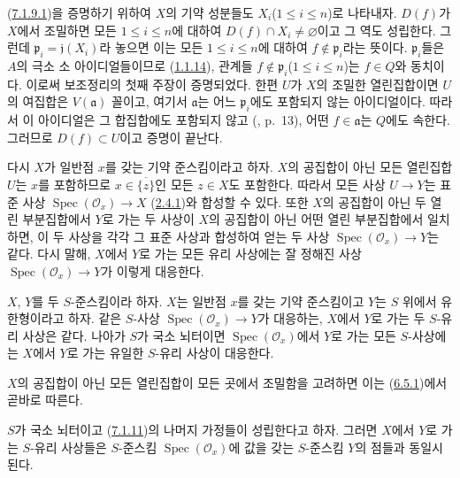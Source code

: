 (\hyperref[I.7.1.9.1-ko]{7.1.9.1})을 증명하기 위하여 $X$의 기약
성분들도 $X_i$($1\leq i\leq n$)로 나타내자. $D(f)$가 $X$에서
조밀하면 모든 $1\leq i\leq n$에 대하여
$D(f)\cap X_i\neq\varnothing$이고 그 역도 성립한다. 그런데
$\mathfrak{p}_i=\mathfrak{j}(X_i)$라 놓으면 이는 모든
$1\leq i\leq n$에 대하여 $f\notin\mathfrak{p}_i$라는 뜻이다.
$\mathfrak{p}_i$들은 $A$의 극소 소 아이디얼들이므로
(\hyperref[I.1.1.14-ko]{1.1.14}), 관계들
$f\notin\mathfrak{p}_i$($1\leq i\leq n$)는 $f\in Q$와 동치이다.
이로써 보조정리의 첫째 주장이 증명되었다. 한편 $U$가 $X$의 조밀한
열린집합이면 $U$의 여집합은 $V(\mathfrak{a})$ 꼴이고, 여기서
$\mathfrak{a}$는 어느 $\mathfrak{p}_i$에도 포함되지 않는
아이디얼이다. 따라서 이 아이디얼은 그 합집합에도 포함되지 않고
(\cite{I-10}, p.~13), 어떤 $f\in\mathfrak{a}$는 $Q$에도 속한다.
그러므로 $D(f)\subset U$이고 증명이 끝난다.

\begin{env}[7.1.10]
\label{I.7.1.10-ko}
다시 $X$가 일반점 $x$를 갖는 기약 준스킴이라고 하자. $X$의
공집합이 아닌 모든 열린집합 $U$는 $x$를 포함하므로
$x\in\overline{\{z\}}$인 모든 $z\in X$도 포함한다. 따라서 모든
사상 $U\to Y$는 표준 사상 $\operatorname{Spec}(\mathscr{O}_x)\to X$
(\hyperref[I.2.4.1-ko]{2.4.1})와 합성할 수 있다. 또한 $X$의 공집합이
아닌 두 열린 부분집합에서 $Y$로 가는 두 사상이 $X$의 공집합이 아닌
어떤 열린 부분집합에서 일치하면, 이 두 사상을 각각 그 표준 사상과
합성하여 얻는 두 사상
$\operatorname{Spec}(\mathscr{O}_x)\to Y$는 같다. 다시 말해,
$X$에서 $Y$로 가는 모든 유리 사상에는 잘 정해진 사상
$\operatorname{Spec}(\mathscr{O}_x)\to Y$가 이렇게 대응한다.
\end{env}

\begin{proposition}[7.1.11]
\label{I.7.1.11-ko}
$X$, $Y$를 두 $S$-준스킴이라 하자. $X$는 일반점 $x$를 갖는
기약 준스킴이고 $Y$는 $S$ 위에서 유한형이라고 하자. 같은
$S$-사상 $\operatorname{Spec}(\mathscr{O}_x)\to Y$가 대응하는,
$X$에서 $Y$로 가는 두 $S$-유리 사상은 같다. 나아가 $S$가 국소
뇌터이면 $\operatorname{Spec}(\mathscr{O}_x)$에서 $Y$로 가는 모든
$S$-사상에는 $X$에서 $Y$로 가는 유일한 $S$-유리 사상이 대응한다.
\end{proposition}

$X$의 공집합이 아닌 모든 열린집합이 모든 곳에서 조밀함을 고려하면
이는 (\hyperref[I.6.5.1-ko]{6.5.1})에서 곧바로 따른다.

\begin{corollary}[7.1.12]
\label{I.7.1.12-ko}
$S$가 국소 뇌터이고 (\hyperref[I.7.1.11-ko]{7.1.11})의 나머지
가정들이 성립한다고 하자. 그러면 $X$에서 $Y$로 가는 $S$-유리
사상들은 $S$-준스킴 $\operatorname{Spec}(\mathscr{O}_x)$에 값을 갖는
$S$-준스킴 $Y$의 점들과 동일시된다.
\end{corollary}


